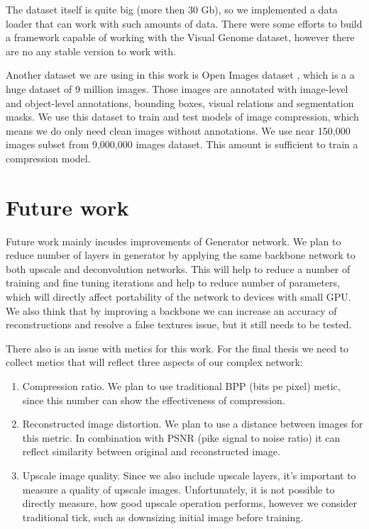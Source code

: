 The dataset itself is quite big (more then 30 Gb), so we implemented a data loader that can work with such amounts of data. There were some efforts \cite{Yang_2018_Graph} to build a framework capable of working with the Visual Genome dataset, however there are no any stable version to work with.

Another dataset we are using in this work is Open Images dataset \cite{OpenImages2}, which is a a huge dataset of 9 million images. Those images are annotated with image-level and object-level annotations, bounding boxes, visual relations and segmentation masks. We use this dataset to train and test models of image compression, which means we do only need clean images without annotations. We use near 150,000 images subset from 9,000,000 images dataset. This amount is sufficient to train a compression model.

\chapter{Future work}

Future work mainly incudes improvements of Generator network. We plan to reduce number of layers in generator by applying the same backbone network to both upscale and deconvolution networks. This will help to reduce a number of training and fine tuning iterations and help to reduce number of parameters, which will directly affect portability of the network to devices with small GPU. We also think that by improving a backbone we can increase an accuracy of reconstructions and resolve a false textures issue, but it still needs to be tested.

There also is an issue with metics for this work. For the final thesis we need to collect metics that will reflect three aspects of our complex network:

\begin{enumerate}
    \item Compression ratio. We plan to use traditional BPP (bits pe pixel) metic, since this number can show the effectiveness of compression.
    \item Reconstructed image distortion. We plan to use a distance between images for this metric. In combination with PSNR (pike signal to noise ratio) it can reflect similarity between original and reconstructed image.
    \item Upscale image quality. Since we also include upscale layers, it's important to measure a quality of upscale images. Unfortunately, it is not possible to directly measure, how good upscale operation performs, however we consider traditional tick, such as downsizing initial image before training.
\end{enumerate}

